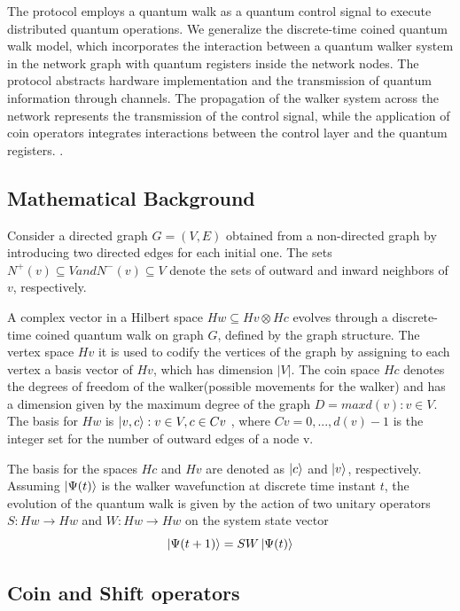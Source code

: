 \documentclass{article}
\begin{document}
    	The protocol employs a quantum walk as a quantum control signal to execute distributed quantum operations. We generalize the discrete-time coined quantum walk model, which incorporates the interaction between a quantum walker system in the network graph with quantum registers inside the network nodes. The protocol abstracts hardware implementation and the transmission of quantum information through channels. The propagation of the walker system across the network represents the transmission of the control signal, while the application of coin operators integrates interactions between the control layer and the quantum registers. \cite{controlplane}.
    
    
    \subsection{Mathematical Background}
    
		Consider a directed graph  $G = (V,E)$ obtained from a non-directed graph by introducing two directed edges for each initial one. The sets $N^{+}(v) \subseteq V and N^{-}(v) \subseteq V$ denote the sets of outward and inward neighbors of $v$, respectively.

		A complex vector in a Hilbert space $Hw \subseteq Hv \otimes Hc$  evolves through a discrete-time coined quantum walk on graph $G$, defined by the graph structure. The vertex space $Hv$ it is used to codify the vertices of the graph by assigning to each vertex a basis vector of $Hv$, which has dimension $|V|$. The coin space $Hc$ denotes the degrees of freedom of the walker(possible movements for the walker) and has a dimension given by the maximum degree of the graph $D = max{d(v): v \in V}$. The basis for $Hw$ is ${\ket{v,c} : v \in V, c \in Cv}$ , where $Cv = {0, ... , d(v) -1}$ is the integer set for the number of outward edges of a node v.

		The basis for the spaces $Hc$ and $Hv$ are denoted as ${\ket{c}}$ and ${\ket{v}}$, respectively. Assuming $\ket{\Psi(t)}$ is the walker wavefunction at discrete time instant $t$, the evolution of the quantum walk is given by the action of two unitary operators $S: Hw \to Hw$ and $W: Hw \to Hw$ on the system state vector $$\ket{\Psi(t+1)}= SW\ket{\Psi(t)}$$ \cite{relationship}
    
    \subsection{Coin and Shift operators}
\end{document}
